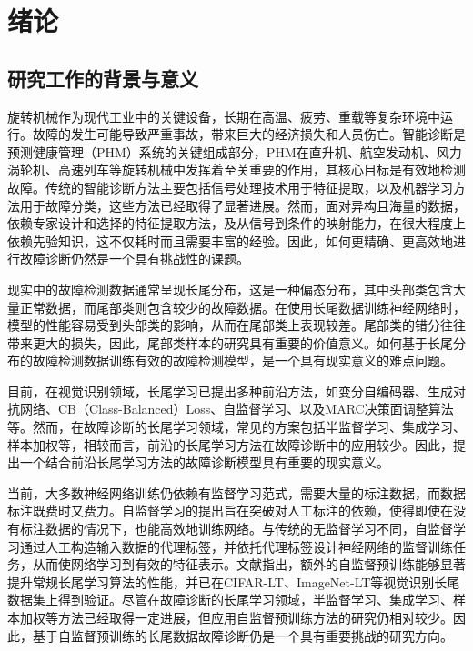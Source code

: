 \documentclass[master]{thesis-uestc}
\begin{document}
\thesistableofcontents

\chapter{绪\hspace{6pt}论}

\section{研究工作的背景与意义}
旋转机械作为现代工业中的关键设备，长期在高温、疲劳、重载等复杂环境中运行。故障的发生可能导致严重事故，带来巨大的经济损失和人员伤亡。智能诊断是预测健康管理（PHM）系统的关键组成部分，PHM在直升机、航空发动机、风力涡轮机、高速列车等旋转机械中发挥着至关重要的作用，其核心目标是有效地检测故障。传统的智能诊断方法主要包括信号处理技术用于特征提取，以及机器学习方法用于故障分类，这些方法已经取得了显著进展。然而，面对异构且海量的数据，依赖专家设计和选择的特征提取方法，及从信号到条件的映射能力，在很大程度上依赖先验知识，这不仅耗时而且需要丰富的经验。因此，如何更精确、更高效地进行故障诊断仍然是一个具有挑战性的课题。

现实中的故障检测数据通常呈现长尾分布，这是一种偏态分布，其中头部类包含大量正常数据，而尾部类则包含较少的故障数据。在使用长尾数据训练神经网络时，模型的性能容易受到头部类的影响，从而在尾部类上表现较差。尾部类的错分往往带来更大的损失，因此，尾部类样本的研究具有重要的价值意义。如何基于长尾分布的故障检测数据训练有效的故障检测模型，是一个具有现实意义的难点问题。

目前，在视觉识别领域，长尾学习已提出多种前沿方法，如变分自编码器、生成对抗网络、CB（Class-Balanced）Loss、自监督学习、以及MARC决策面调整算法等。然而，在故障诊断的长尾学习领域，常见的方案包括半监督学习、集成学习、样本加权等，相较而言，前沿的长尾学习方法在故障诊断中的应用较少。因此，提出一个结合前沿长尾学习方法的故障诊断模型具有重要的现实意义。

当前，大多数神经网络训练仍依赖有监督学习范式，需要大量的标注数据，而数据标注既费时又费力。自监督学习的提出旨在突破对人工标注的依赖，使得即使在没有标注数据的情况下，也能高效地训练网络。与传统的无监督学习不同，自监督学习通过人工构造输入数据的代理标签，并依托代理标签设计神经网络的监督训练任务，从而使网络学习到有效的特征表示。文献\cite{zhang2021federated}指出，额外的自监督预训练能够显著提升常规长尾学习算法的性能，并已在CIFAR-LT、ImageNet-LT等视觉识别长尾数据集上得到验证。尽管在故障诊断的长尾学习领域，半监督学习、集成学习、样本加权等方法已经取得一定进展，但应用自监督预训练方法的研究仍相对较少。因此，基于自监督预训练的长尾数据故障诊断仍是一个具有重要挑战的研究方向。
\end{document}
